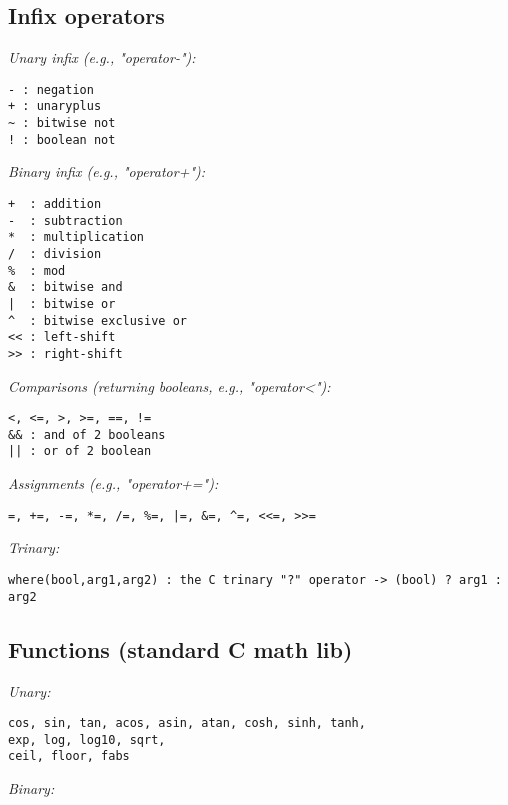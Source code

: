 \documentclass[12pt,letterpaper]{article}
\begin{document}
\medskip

\subsection{Infix operators}
\label{sec:infix}

\noindent
{\em Unary infix (e.g., "operator-"):}

\begin{verbatim}
- : negation
+ : unaryplus
~ : bitwise not
! : boolean not
\end{verbatim}

\noindent
{\em Binary infix (e.g., "operator+"):}

\begin{verbatim}
+  : addition
-  : subtraction
*  : multiplication
/  : division
%  : mod
&  : bitwise and
|  : bitwise or
^  : bitwise exclusive or
<< : left-shift
>> : right-shift
\end{verbatim}

\noindent
{\em Comparisons (returning booleans, e.g., "operator<"):}

\begin{verbatim}
<, <=, >, >=, ==, !=
&& : and of 2 booleans
|| : or of 2 boolean
\end{verbatim}


\noindent
{\em Assignments (e.g., "operator+="):}

\begin{verbatim}
=, +=, -=, *=, /=, %=, |=, &=, ^=, <<=, >>=
\end{verbatim}

\noindent
{\em Trinary:}

\begin{verbatim}
where(bool,arg1,arg2) : the C trinary "?" operator -> (bool) ? arg1 : arg2
\end{verbatim}

\medskip


\subsection{Functions (standard C math lib)}
\label{sec:cfuncs}

\noindent
{\em Unary:}

\begin{verbatim}
cos, sin, tan, acos, asin, atan, cosh, sinh, tanh,
exp, log, log10, sqrt,
ceil, floor, fabs
\end{verbatim}

\noindent
{\em Binary:}
\end{document}
